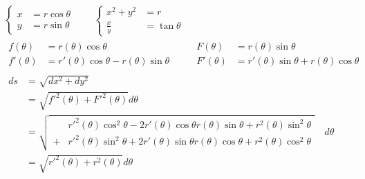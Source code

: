 \documentclass{article}
\begin{document}
  \begin{gather*}
    \left\{\begin{aligned}
      x &= r\cos{\theta} \\
      y &= r\sin{\theta}
    \end{aligned}\right.
    \qquad
    \left\{\begin{aligned}
      x^{2} + y^{2} &= r \\
      \frac{x}{y} &= \tan{\theta}
    \end{aligned}\right. \\
    \begin{aligned}
      f(\theta) &= r(\theta)\cos{\theta} \\
      f'(\theta) &=  r'(\theta)\cos{\theta} - r(\theta)\sin{\theta}
    \end{aligned}
    \qquad
    \begin{aligned}
      F(\theta) &= r(\theta)\sin{\theta} \\
      F'(\theta) &= r'(\theta)\sin{\theta} + r(\theta)\cos{\theta}
    \end{aligned} \\
    \begin{aligned}
      ds &= \sqrt{dx^{2} + dy^{2}} \\
      &= \sqrt{f'^{2}(\theta) + F'^{2}(\theta)} d\theta \\
      &= \sqrt{\begin{aligned}
        &r'^{2}(\theta)\cos^{2}{\theta} - 2 r'(\theta)\cos{\theta} r(\theta)\sin{\theta} + r^{2}(\theta)\sin^{2}{\theta} \\
        + &r'^{2}(\theta)\sin^{2}{\theta} + 2 r'(\theta)\sin{\theta} r(\theta)\cos{\theta} + r^{2}(\theta)\cos^{2}{\theta}
      \end{aligned}} \quad d\theta \\
      &= \sqrt{r'^{2}(\theta) + r^{2}(\theta)} d\theta
    \end{aligned}
  \end{gather*}
\end{document}
